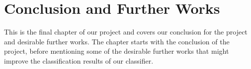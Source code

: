 \chapter{Conclusion and Further Works}
This is the final chapter of our project and covers our conclusion for the project and desirable further works. The chapter starts with the conclusion of the project, before mentioning some of the desirable further works that might improve the classification results of our classifier. 

\begin{comment}
The conclusion 

where we conclude that it is possible to get a good indication of an articles content just by exploring titles of Wikipedia articles. And finally, the chapter covers desirable further works that might improve the classification results from our classifier. 


There are both improvements and desirable further work available for this study. 
\end{comment}




